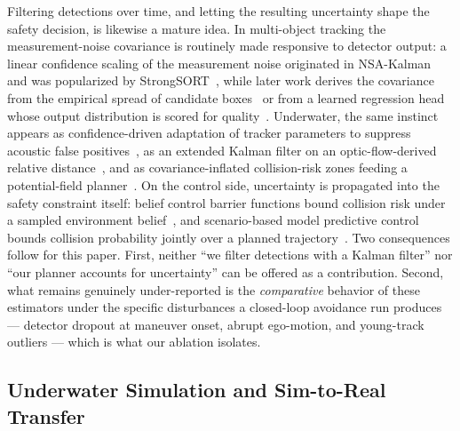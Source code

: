 Filtering detections over time, and letting the resulting uncertainty shape
the safety decision, is likewise a mature idea. In multi-object tracking the
measurement-noise covariance is routinely made responsive to detector
output: a linear confidence scaling of the measurement noise originated in
NSA-Kalman~\cite{du2021giaotrac} and was popularized by
StrongSORT~\cite{du2023strongso}, while later work derives the covariance
from the empirical spread of candidate boxes~\cite{solanocarrillo2024utrackmu}
or from a learned regression head whose output distribution is scored for
quality~\cite{lee2024uncertai}. Underwater, the same instinct appears as
confidence-driven adaptation of tracker parameters to suppress acoustic
false positives~\cite{li2026underwat}, as an extended Kalman filter on an
optic-flow-derived relative distance~\cite{bergantin2024realtime}, and as
covariance-inflated collision-risk zones feeding a potential-field
planner~\cite{li2024anobstac}. On the control side, uncertainty is
propagated into the safety constraint itself: belief control barrier
functions bound collision risk under a sampled environment
belief~\cite{han2025riskaware,han2026riskawar}, and scenario-based model
predictive control bounds collision probability jointly over a planned
trajectory~\cite{groot2025scenario}. Two consequences follow for this paper.
First, neither ``we filter detections with a Kalman filter'' nor ``our
planner accounts for uncertainty'' can be offered as a contribution. Second,
what remains genuinely under-reported is the \emph{comparative} behavior of
these estimators under the specific disturbances a closed-loop avoidance run
produces --- detector dropout at maneuver onset, abrupt ego-motion, and
young-track outliers --- which is what our ablation isolates.

\subsection{Underwater Simulation and Sim-to-Real Transfer}

